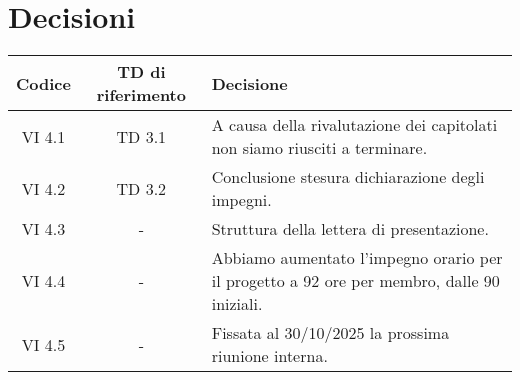 \section{Decisioni}

	\begin{table}[htbp]
		\begin{tabular}{|c|c|p{}|}
			\hline
			\rowcolor[gray]{0.9}
			Codice & TD di riferimento & Decisione \\
                             \hline
			VI 4.1 & TD 3.1 & A causa della rivalutazione dei capitolati non siamo riusciti a terminare. \\
			\hline
			VI 4.2 & TD 3.2 & Conclusione stesura dichiarazione degli impegni. \\ 
			\hline
			VI 4.3 & - & Struttura della lettera di presentazione.\\
			\hline
			VI 4.4 & - & Abbiamo aumentato l'impegno orario per il progetto a 92 ore per membro, dalle 90 iniziali.\\
			\hline
			VI 4.5 & - & Fissata al 30/10/2025 la prossima riunione interna.\\
			\hline
		\end{tabular}
	\end{table}